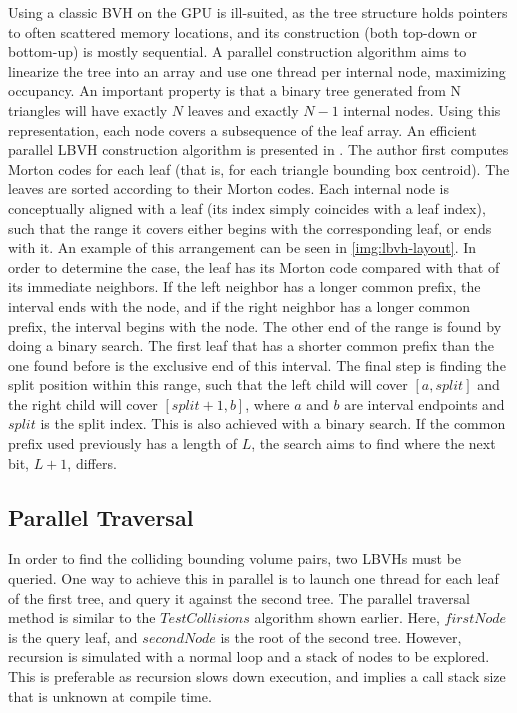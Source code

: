 Using a classic BVH on the GPU is ill-suited, as the tree structure holds pointers to often scattered memory locations, and its construction (both top-down or bottom-up) is mostly sequential. A parallel construction algorithm aims to linearize the tree into an array and use one thread per internal node, maximizing occupancy. An important property is that a binary tree generated from N triangles will have exactly $N$ leaves and exactly $N - 1$ internal nodes. Using this representation, each node covers a subsequence of the leaf array. An efficient parallel LBVH construction algorithm is presented in \citep{karras2012}. The author first computes Morton codes for each leaf (that is, for each triangle bounding box centroid). The leaves are sorted according to their Morton codes. Each internal node is conceptually aligned with a leaf (its index simply coincides with a leaf index), such that the range it covers either begins with the corresponding leaf, or ends with it. An example of this arrangement can be seen in \autoref{img:lbvh-layout}. In order to determine the case, the leaf has its Morton code compared with that of its immediate neighbors. If the left neighbor has a longer common prefix, the interval ends with the node, and if the right neighbor has a longer common prefix, the interval begins with the node. The other end of the range is found by doing a binary search. The first leaf that has a shorter common prefix than the one found before is the exclusive end of this interval. The final step is finding the split position within this range, such that the left child will cover $[a, split]$ and the right child will cover $[split + 1, b]$, where $a$ and $b$ are interval endpoints and $split$ is the split index. This is also achieved with a binary search. If the common prefix used previously has a length of $L$, the search aims to find where the next bit, $L + 1$, differs.


\subsection{Parallel Traversal}
\label{sub-sec-lbvhtrav}

In order to find the colliding bounding volume pairs, two LBVHs must be queried. One way to achieve this in parallel is to launch one thread for each leaf of the first tree, and query it against the second tree. The parallel traversal method is similar to the \hyperref[alg:BVHQuery]{$TestCollisions$} algorithm shown earlier. Here, $firstNode$ is the query leaf, and $secondNode$ is the root of the second tree. However, recursion is simulated with a normal loop and a stack of nodes to be explored. This is preferable as recursion slows down execution, and implies a call stack size that is unknown at compile time. 


